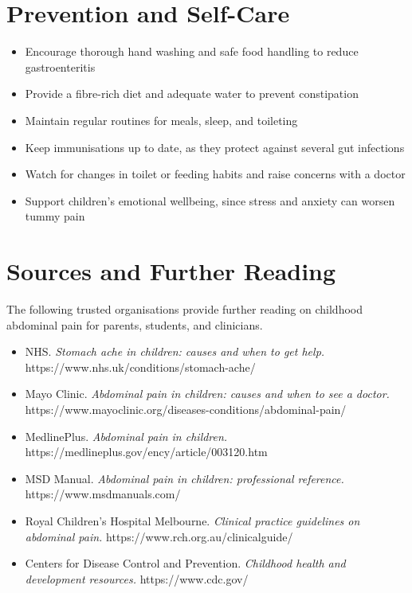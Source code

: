 \section*{Prevention and Self-Care}
\begin{itemize}
    \item Encourage thorough hand washing and safe food handling to reduce gastroenteritis
    \item Provide a fibre-rich diet and adequate water to prevent constipation
    \item Maintain regular routines for meals, sleep, and toileting
    \item Keep immunisations up to date, as they protect against several gut infections
    \item Watch for changes in toilet or feeding habits and raise concerns with a doctor
    \item Support children's emotional wellbeing, since stress and anxiety can worsen tummy pain
\end{itemize}

\section*{Sources and Further Reading}
The following trusted organisations provide further reading on childhood abdominal pain for parents, students, and clinicians.

\begin{itemize}
    \item NHS. \textit{Stomach ache in children: causes and when to get help.} https://www.nhs.uk/conditions/stomach-ache/
    \item Mayo Clinic. \textit{Abdominal pain in children: causes and when to see a doctor.} https://www.mayoclinic.org/diseases-conditions/abdominal-pain/
    \item MedlinePlus. \textit{Abdominal pain in children.} https://medlineplus.gov/ency/article/003120.htm
    \item MSD Manual. \textit{Abdominal pain in children: professional reference.} https://www.msdmanuals.com/
    \item Royal Children's Hospital Melbourne. \textit{Clinical practice guidelines on abdominal pain.} https://www.rch.org.au/clinicalguide/
    \item Centers for Disease Control and Prevention. \textit{Childhood health and development resources.} https://www.cdc.gov/
\end{itemize}

